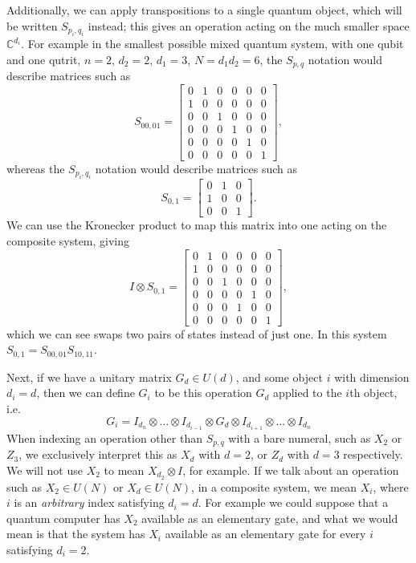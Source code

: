 Additionally, we can apply transpositions to a single quantum object, which will be written $S_{p_i,q_i}$ instead; this gives an operation acting on the much smaller space $\mathbb{C}^{d_i}$. For example in the smallest possible mixed quantum system, with one qubit and one qutrit, $n=2$, $d_2 = 2$, $d_1 = 3$, $N = d_1d_2 = 6$, the $S_{p,q}$ notation would describe matrices such as
\[S_{00,01} = \begin{bmatrix}
0 & 1 & 0 & 0 & 0 & 0 \\
1 & 0 & 0 & 0 & 0 & 0 \\
0 & 0 & 1 & 0 & 0 & 0 \\
0 & 0 & 0 & 1 & 0 & 0 \\
0 & 0 & 0 & 0 & 1 & 0 \\
0 & 0 & 0 & 0 & 0 & 1
\end{bmatrix},\] 
whereas the $S_{p_i,q_i}$ notation would describe matrices such as
\[S_{0,1} = \begin{bmatrix}
0 & 1 & 0 \\
1 & 0 & 0 \\
0 & 0 & 1
\end{bmatrix}.\]
We can use the Kronecker product to map this matrix into one acting on the composite system, giving
\[I \otimes S_{0,1} = \begin{bmatrix}
0 & 1 & 0 & 0 & 0 & 0 \\
1 & 0 & 0 & 0 & 0 & 0 \\
0 & 0 & 1 & 0 & 0 & 0 \\
0 & 0 & 0 & 0 & 1 & 0 \\
0 & 0 & 0 & 1 & 0 & 0 \\
0 & 0 & 0 & 0 & 0 & 1
\end{bmatrix},\]
which we can see swaps two pairs of states instead of just one. In this system $S_{0,1} = S_{00,01} S_{10,11}$.

Next, if we have a unitary matrix $G_{d} \in U(d)$, and some object $i$ with dimension $d_i = d$, then we can define $G_i$ to be this operation $G_d$ applied to the $i$th object, i.e. 
\[G_i = I_{d_n}\otimes \dots \otimes I_{d_{i-1}} \otimes G_d \otimes I_{d_{i+1}} \otimes \dots \otimes I_{d_n}\]
When indexing an operation other than $S_{p,q}$ with a bare numeral, such as $X_2$ or $Z_3$, we exclusively interpret this as $X_d$ with $d = 2$, or $Z_d$ with $d = 3$ respectively. We will not use $X_2$ to mean $X_{d_2} \otimes I$, for example. If we talk about an operation such as  $X_2 \in U(N)$ or $X_d \in U(N)$, in a composite system, we mean $X_i$, where $i$ is an \emph{arbitrary} index satisfying $d_i = d$. For example we could suppose that a quantum computer has $X_2$ available as an elementary gate, and what we would mean is that the system has $X_i$ available as an elementary gate for every $i$ satisfying $d_i = 2$.

